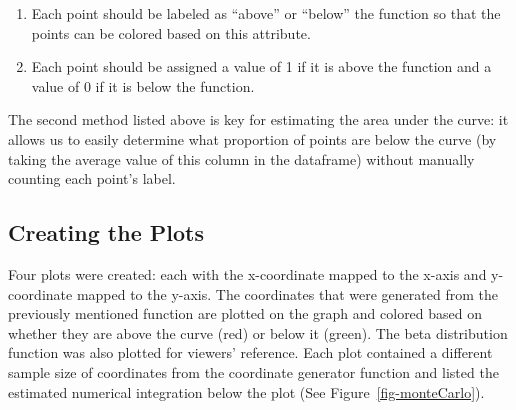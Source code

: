 \documentclass[
  letterpaper,
  DIV=11,
  numbers=noendperiod]{scrartcl}
\providecommand{\tightlist}{%
  \setlength{\itemsep}{0pt}\setlength{\parskip}{0pt}}
\begin{document}
\begin{enumerate}
\def\labelenumi{\arabic{enumi}.}
\tightlist
\item
  Each point should be labeled as ``above'' or ``below'' the function so
  that the points can be colored based on this attribute.
\item
  Each point should be assigned a value of 1 if it is above the function
  and a value of 0 if it is below the function.
\end{enumerate}

The second method listed above is key for estimating the area under the
curve: it allows us to easily determine what proportion of points are
below the curve (by taking the average value of this column in the
dataframe) without manually counting each point's label.

\subsection{Creating the Plots}\label{creating-the-plots}

Four plots were created: each with the x-coordinate mapped to the x-axis
and y-coordinate mapped to the y-axis. The coordinates that were
generated from the previously mentioned function are plotted on the
graph and colored based on whether they are above the curve (red) or
below it (green). The beta distribution function was also plotted for
viewers' reference. Each plot contained a different sample size of
coordinates from the coordinate generator function and listed the
estimated numerical integration below the plot (See
Figure~\ref{fig-monteCarlo}).
\end{document}
